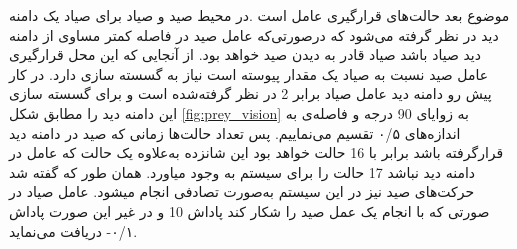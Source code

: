 موضوع بعد حالت‌های قرارگیری عامل است .در محیط صید و صیاد برای صیاد یک دامنه دید در نظر گرفته می‌شود که درصورتی‌که عامل صید در فاصله کمتر مساوی از دامنه دید صیاد باشد صیاد قادر به دیدن صید خواهد بود. از آنجایی که این محل  قرارگیری عامل صید نسبت به صیاد یک مقدار پیوسته است نیاز به گسسته سازی دارد. در کار پیش رو دامنه دید عامل صیاد برابر 2 در نظر گرفته‌شده است و برای گسسته سازی این دامنه دید را مطابق شکل \ref{fig:prey_vision} به زوایای 90 درجه و فاصله‌ی به ‌اندازه‌های ۰/۵ تقسیم می‌نماییم. پس تعداد حالت‌ها زمانی که صید در دامنه دید قرارگرفته باشد برابر با 16 حالت خواهد بود این شانزده به‌علاوه یک حالت که عامل در دامنه دید نباشد 17 حالت را برای سیستم به وجود میاورد. همان طور که گفته شد حرکت‌های صید نیز در این سیستم به‌صورت تصادفی انجام میشود. عامل صیاد در صورتی که با انجام یک عمل صید را شکار کند پاداش 10 و در غیر این صورت پاداش  ۰/۱- دریافت می‌نماید.
